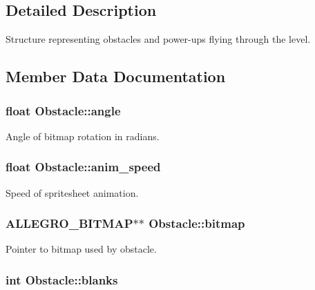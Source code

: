 \subsection{\-Detailed \-Description}
\-Structure representing obstacles and power-\/ups flying through the level. 

\subsection{\-Member \-Data \-Documentation}
\hypertarget{structObstacle_a99d85ef4e92f7e899b49ac85b2e1dbdc}{
\subsubsection[{angle}]{\setlength{\rightskip}{0pt plus 5cm}float {\bf \-Obstacle\-::angle}}}\label{structObstacle_a99d85ef4e92f7e899b49ac85b2e1dbdc}
\-Angle of bitmap rotation in radians. \hypertarget{structObstacle_a96a13e4704e4643291989193a112366a}{
\subsubsection[{anim\-\_\-speed}]{\setlength{\rightskip}{0pt plus 5cm}float {\bf \-Obstacle\-::anim\-\_\-speed}}}\label{structObstacle_a96a13e4704e4643291989193a112366a}
\-Speed of spritesheet animation. \hypertarget{structObstacle_a1f35f88fe8f6d0664da082f82ae4b774}{
\subsubsection[{bitmap}]{\setlength{\rightskip}{0pt plus 5cm}\-A\-L\-L\-E\-G\-R\-O\-\_\-\-B\-I\-T\-M\-A\-P$\ast$$\ast$ {\bf \-Obstacle\-::bitmap}}}\label{structObstacle_a1f35f88fe8f6d0664da082f82ae4b774}
\-Pointer to bitmap used by obstacle. \hypertarget{structObstacle_a862f4038bd63057d91406720bb586a9c}{
\subsubsection[{blanks}]{\setlength{\rightskip}{0pt plus 5cm}int {\bf \-Obstacle\-::blanks}}}\label{structObstacle_a862f4038bd63057d91406720bb586a9c}
